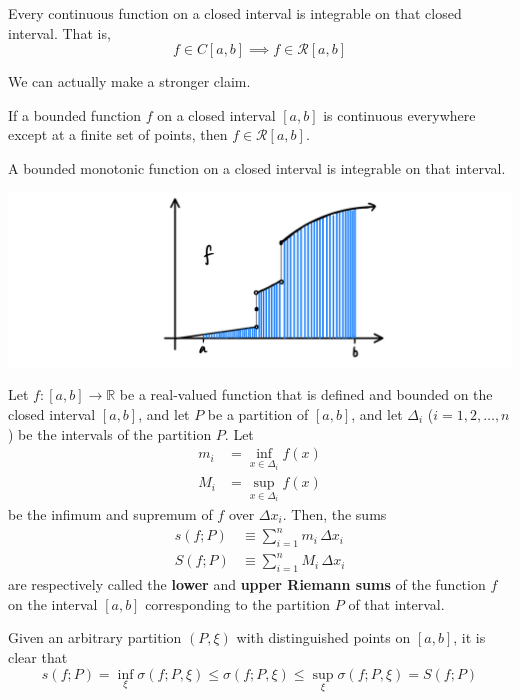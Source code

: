     \begin{corollary}
    Every continuous function on a closed interval is integrable on that closed interval. That is, 
    \[f \in C[a, b] \implies f \in \mathcal{R}[a, b]\]
    \end{corollary}

    We can actually make a stronger claim. 

    \begin{corollary}
    If a bounded function $f$ on a closed interval $[a, b]$ is continuous everywhere except at a finite set of points, then $f \in \mathcal{R}[a, b]$. 
    \end{corollary}

    \begin{corollary}
    A bounded monotonic function on a closed interval is integrable on that interval. 
    \begin{center}
        \includegraphics[scale=0.25]{img/Integrability_of_Monotonic_Function.PNG}
    \end{center}
    \end{corollary}

    \begin{definition}
      Let $f: [a, b] \longrightarrow \mathbb{R}$ be a real-valued function that is defined and bounded on the closed interval $[a, b]$, and let $P$ be a partition of $[a, b]$, and let $\Delta_i$ ($i = 1, 2, \ldots, n$) be the intervals of the partition $P$. Let 
      \begin{align*}
          m_i &= \inf_{x \in \Delta_i} f(x) \\
          M_i &= \sup_{x \in \Delta_i} f(x)
      \end{align*}
      be the infimum and supremum of $f$ over $\Delta x_i$. Then, the sums
      \begin{align*}
          s(f; P) & \equiv \sum_{i = 1}^n m_i \, \Delta x_i \\
          S(f; P) & \equiv \sum_{i=1}^n M_i \, \Delta x_i
      \end{align*}
      are respectively called the \textbf{lower} and \textbf{upper Riemann sums} of the function $f$ on the interval $[a, b]$ corresponding to the partition $P$ of that interval. 

      Given an arbitrary partition $(P, \xi)$ with distinguished points on $[a, b]$, it is clear that
      \[s(f; P) = \inf_{\xi} \sigma(f; P, \xi) \leq \sigma(f; P, \xi) \leq \sup_{\xi} \sigma(f; P, \xi) = S(f; P)\]
    \end{definition}

